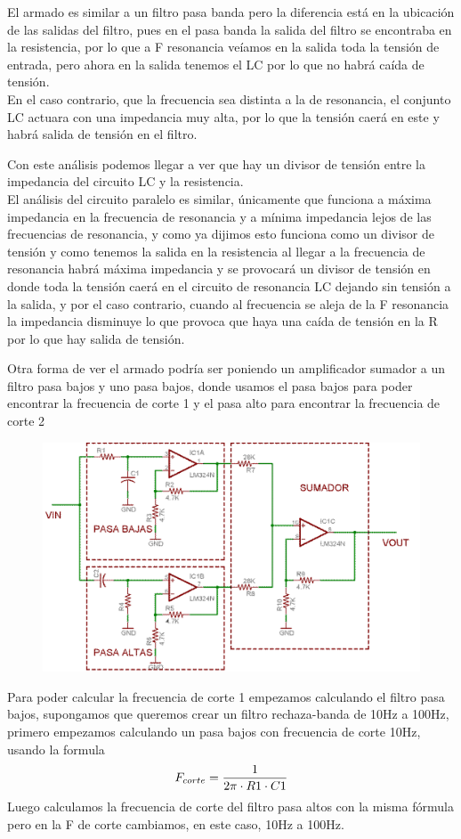 \documentclass[../main.tex]{subfiles}
\begin{document}
	El armado es similar a un filtro pasa banda pero la diferencia está en la 
	ubicación de las salidas del filtro, pues en el pasa banda la salida del
	filtro se encontraba en la resistencia, por lo que a F resonancia veíamos 
	en la salida toda la tensión de entrada, pero ahora en 
	la salida tenemos el LC por lo que no habrá caída de tensión.\\

	En el caso contrario, que la frecuencia sea distinta a la de resonancia,
	el conjunto LC actuara con una impedancia muy alta, por lo que la tensión
	caerá en este y habrá salida de tensión en el filtro.

	Con este análisis podemos llegar a ver que hay un divisor de tensión entre
	la impedancia del circuito LC y la resistencia.\\

	El análisis del circuito paralelo es similar, únicamente que funciona a 
	máxima impedancia en la frecuencia de resonancia y a mínima
	impedancia lejos de las frecuencias de resonancia, y como ya dijimos esto
	funciona como un divisor de tensión y como tenemos la salida en la 
	resistencia al llegar a la frecuencia de resonancia habrá máxima impedancia y se provocará
	un divisor de tensión en donde toda la tensión caerá en el circuito de resonancia LC
	dejando sin tensión a la salida, y por el caso contrario, cuando al frecuencia se aleja
	de la F resonancia la impedancia disminuye lo que provoca que haya una caída de tensión
	en la R por lo que hay salida de tensión. 

	Otra forma de ver el armado podría ser poniendo un amplificador sumador a un filtro
	pasa bajos y uno pasa bajos, donde usamos el pasa bajos para poder encontrar la
	frecuencia de corte 1 y el pasa alto para encontrar la frecuencia de corte 2

	\begin{figure}[H]
		\centering
		\includegraphics[width=\textwidth]{filtros/rechaza-banda_circuito2.png}
	\end{figure}

	Para poder calcular la frecuencia de corte 1 empezamos calculando el filtro
	pasa bajos, supongamos que queremos crear un filtro rechaza-banda de
	10Hz a 100Hz, primero empezamos calculando un pasa bajos con frecuencia 
	de corte 10Hz, usando la formula
	\[
		F_{corte} = \dfrac {1}{2\pi \cdot R1 \cdot C1}
	\]
	Luego calculamos la frecuencia de corte del filtro pasa altos
	con la misma fórmula pero en la F de corte cambiamos, en este caso, 10Hz a 100Hz.
\end{document}
